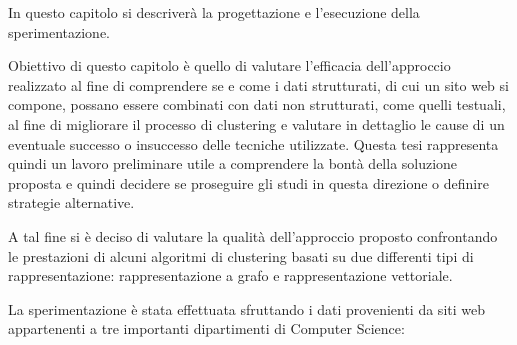 

In questo capitolo si descriverà la progettazione e l’esecuzione della sperimentazione. 

Obiettivo di questo capitolo è quello di valutare l’efficacia dell'approccio realizzato al fine di comprendere se e come i dati strutturati, di cui un sito web si compone,  possano essere combinati con dati non strutturati, come quelli testuali, al fine di migliorare il processo di clustering e valutare in dettaglio le cause di un eventuale successo o insuccesso delle tecniche utilizzate. Questa tesi rappresenta quindi un lavoro preliminare utile a comprendere la bontà della soluzione proposta e quindi decidere se proseguire gli studi in questa direzione o definire strategie alternative.

A tal fine si è deciso di valutare la qualità dell'approccio proposto confrontando le prestazioni di alcuni algoritmi di clustering basati su due differenti tipi di rappresentazione: rappresentazione a grafo e rappresentazione vettoriale.

La sperimentazione è stata effettuata sfruttando i dati provenienti da siti web appartenenti a tre importanti dipartimenti di Computer Science:

